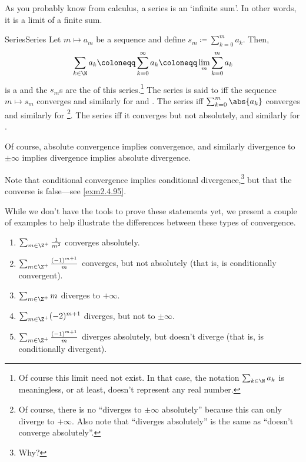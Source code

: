 As you probably know from calculus, a series is an `infinite sum'.  In other words, it is a limit of a finite sum.
\begin{dfn}{Series}{Series}
Let $m\mapsto a_m$ be a sequence and define $s_m\coloneqq \sum _{k=0}^ma_k$.  Then,
\begin{equation}
\sum _{k\in \N}a_k\coloneqq \sum _{k=0}^\infty a_k\coloneqq \lim _m\sum _{k=0}^ma_k
\end{equation}
is a  and the $s_m$s are the  of this series.\footnote{Of course this limit need not exist.  In that case, the notation $\sum _{k\in \N}a_k$ is meaningless, or at least, doesn't represent any real number.}  The series is said to  iff the sequence $m\mapsto s_m$ converges and similarly for  and .  The series  iff $\sum _{k=0}^m\abs{a_k}$ converges and similarly for \footnote{Of course, there is no ``diverges to $\pm \infty$ absolutely'' because this can only diverge to $+\infty$.  Also note that ``diverges absolutely'' is the same as ``doesn't converge absolutely''.}.  The series  iff it converges but not absolutely, and similarly for .
\begin{rmk}
Of course, absolute convergence implies convergence, and similarly divergence to $\pm \infty$ implies divergence implies absolute divergence.
\end{rmk}
\begin{rmk}
Note that conditional convergence implies conditional divergence,\footnote{Why?} but that the converse is false---see \cref{exm2.4.95}.
\end{rmk}
\end{dfn}
\begin{exm}{}{}
While we don't have the tools to prove these statements yet, we present a couple of examples to help illustrate the differences between these types of convergence.

\begin{enumerate}
\item $\sum _{m\in \Z ^+}\frac{1}{m^2}$ converges absolutely.
\item $\sum _{m\in \Z ^+}\frac{(-1)^{m+1}}{m}$ converges, but not absolutely (that is, is conditionally convergent).
\item $\sum _{m\in \Z ^+}m$ diverges to $+\infty$.
\item $\sum _{m\in \Z ^+}(-2)^{m+1}$ diverges, but not to $\pm \infty$.
\item $\sum _{m\in \Z ^+}\frac{(-1)^{m+1}}{m}$ diverges absolutely, but doesn't diverge (that is, is conditionally divergent).
\end{enumerate}
\end{exm}
